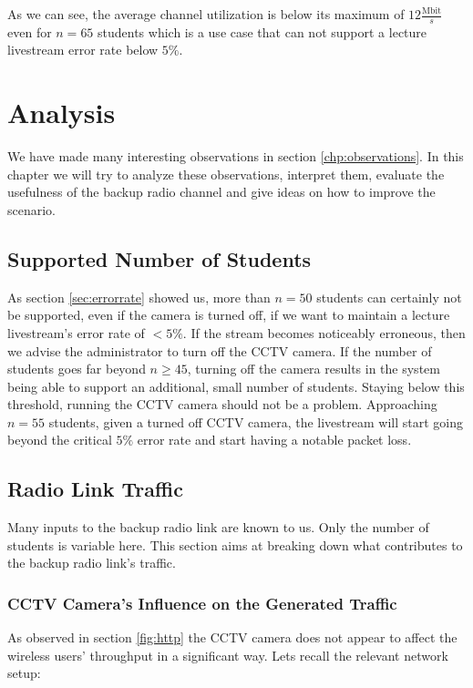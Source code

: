 \documentclass[a4paper]{scrreprt}
\begin{document}
			As we can see, the average channel utilization is below its maximum of $12\frac{\text{Mbit}}{s}$ even for $n=65$ students which is a use case that can not support a lecture livestream error rate below $5\%$.	
		
	\chapter{Analysis}\label{sec:analysis}
		We have made many interesting observations in section \ref{chp:observations}. In this chapter we will try to analyze these observations, interpret them, evaluate the usefulness of the backup radio channel and give ideas on how to improve the scenario.				
		
		\section{Supported Number of Students}
		As section \ref{sec:errorrate} showed us, more than $n=50$ students can certainly not be supported, even if the camera is turned off, if we want to maintain a lecture livestream's error rate of $<5\%$. If the stream becomes noticeably erroneous, then we advise the administrator to turn off the CCTV camera. If the number of students goes far beyond $n\geq 45$, turning off the camera results in the system being able to support an additional, small number of students. Staying below this threshold, running the CCTV camera should not be a problem. Approaching $n=55$ students, given a turned off CCTV camera, the livestream will start going beyond the critical $5\%$ error rate and start having a notable packet loss.	
		
		\section{Radio Link Traffic}
		Many inputs to the backup radio link are known to us. Only the number of students is variable here. This section aims at breaking down what contributes to the backup radio link's traffic.
		
			\subsection{CCTV Camera's Influence on the Generated Traffic}\label{sec:cctvinfluence}
			As observed in section \ref{fig:http} the CCTV camera does not appear to affect the wireless users' throughput in a significant way. Lets recall the relevant network setup:
			
\end{document}
